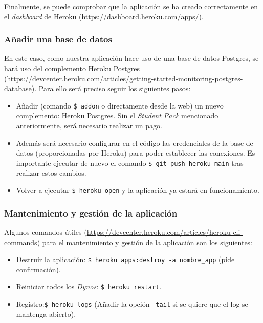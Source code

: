 Finalmente, se puede comprobar que la aplicación se ha creado correctamente en el \textit{dashboard} de Heroku (\url{https://dashboard.heroku.com/apps/}).

\subsubsection{Añadir una base de datos}
En este caso, como nuestra aplicación hace uso de una base de datos Postgres, se hará uso del complemento Heroku Postgres (\url{https://devcenter.heroku.com/articles/getting-started-monitoring-postgres-database}). Para ello será preciso seguir los siguientes pasos:

\begin{itemize}
    \item Añadir (comando \texttt{\$ addon} o directamente desde la web) un nuevo complemento: Heroku Postgres. Sin el \textit{Student Pack} mencionado anteriormente, será necesario realizar un pago.
    
    \item Además será necesario configurar en el código las credenciales de la base de datos (proporcionadas por Heroku) para poder establecer las conexiones. Es importante ejecutar de nuevo el comando \texttt{\$ git push heroku main} tras realizar estos cambios.

    \item Volver a ejecutar \texttt{\$ heroku open} y la aplicación ya estará en funcionamiento.
\end{itemize}

\subsubsection{Mantenimiento y gestión de la aplicación}
Algunos comandos útiles (\url{https://devcenter.heroku.com/articles/heroku-cli-commands}) para el mantenimiento y gestión de la aplicación son los siguientes:

\begin{itemize}
    \item Destruir la aplicación: \texttt{\$ heroku apps:destroy -a nombre\_app} (pide confirmación).
    
    \item Reiniciar todos los \textit{Dynos}: \texttt{\$ heroku restart}.
    
    \item Registro:\texttt{\$ heroku logs} (Añadir la opción \texttt{--tail} si se quiere que el log se mantenga abierto).
\end{itemize}


